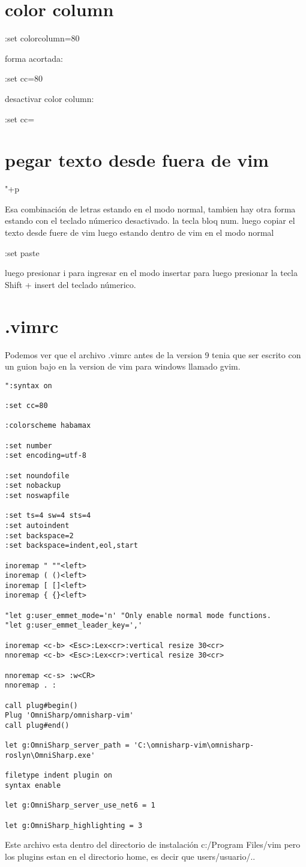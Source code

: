 \section{color column}

:set colorcolumn=80

forma acortada:

:set cc=80

desactivar color column:

:set cc=

\section{pegar texto desde fuera de vim}

"+p

Esa combinación de letras estando en el modo normal, tambien hay otra forma
estando con el teclado númerico desactivado. la tecla bloq num. luego copiar
el texto desde fuere de vim luego estando dentro de vim en el modo normal

:set paste

luego presionar i para ingresar en el modo insertar para luego presionar
la tecla Shift +  insert del teclado númerico.

\section{.vimrc}

Podemos ver que el archivo .vimrc antes de la version 9 tenia que ser
escrito con un guion bajo en la version de vim para windows llamado gvim.

\begin{lstlisting}
":syntax on

:set cc=80

:colorscheme habamax

:set number
:set encoding=utf-8

:set noundofile
:set nobackup
:set noswapfile

:set ts=4 sw=4 sts=4
:set autoindent
:set backspace=2
:set backspace=indent,eol,start

inoremap " ""<left>
inoremap ( ()<left>
inoremap [ []<left>
inoremap { {}<left>

"let g:user_emmet_mode='n' "Only enable normal mode functions.
"let g:user_emmet_leader_key=','

inoremap <c-b> <Esc>:Lex<cr>:vertical resize 30<cr>
nnoremap <c-b> <Esc>:Lex<cr>:vertical resize 30<cr>

nnoremap <c-s> :w<CR>
nnoremap . :

call plug#begin()
Plug 'OmniSharp/omnisharp-vim'
call plug#end()

let g:OmniSharp_server_path = 'C:\omnisharp-vim\omnisharp-roslyn\OmniSharp.exe'

filetype indent plugin on
syntax enable

let g:OmniSharp_server_use_net6 = 1

let g:OmniSharp_highlighting = 3
\end{lstlisting}

Este archivo esta dentro del directorio de instalación c:/Program Files/vim
pero los plugins estan en el directorio home, es decir que users/usuario/..
